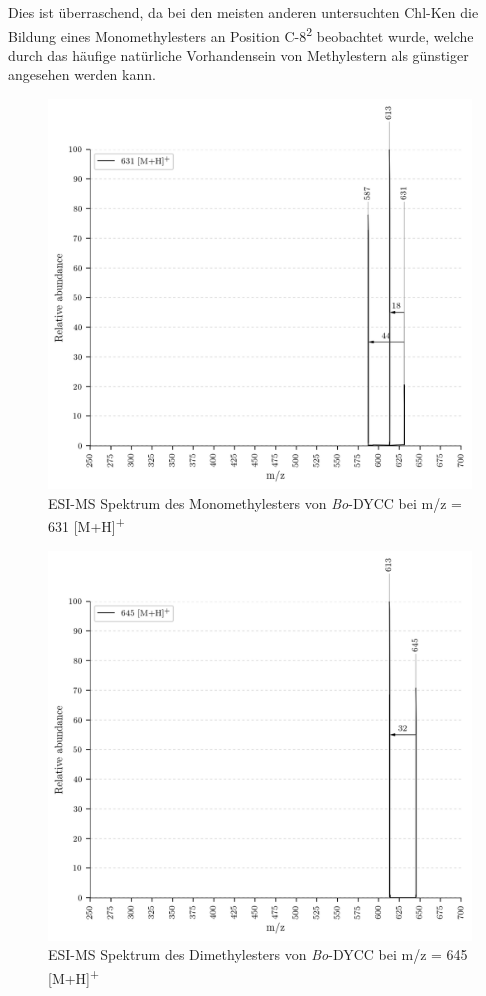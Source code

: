 Dies ist überraschend, da bei den meisten anderen untersuchten \gls{Chl-K}en die Bildung eines Monomethylesters an Position C-8\textsuperscript{2} beobachtet wurde, welche durch das häufige natürliche Vorhandensein von Methylestern als günstiger angesehen werden kann.

\begin{figure}[!htbp]
  \centering
  \includegraphics[width=\textwidth, height=0.7\textwidth]{figures/Kapitel7/Kataboliten/VWA_MS_631.png}
  \caption[ESI-MS Spektrum des Monomethylesters von \textit{Bo}-DYCC, Quelle: Author]{ESI-MS Spektrum des Monomethylesters von \textit{Bo}-DYCC bei m/z = 631 [M+H]\textsuperscript{+}}
  \label{fig:631MH}
\end{figure}

\begin{figure}[!htbp]
  \centering
  \includegraphics[width=\textwidth, height=0.6\textwidth]{figures/Kapitel7/Kataboliten/VWA_MS_645-2.png}
  \caption[ESI-MS Spektrum des Diethylesters von \textit{Bo}-DYCC, Quelle: Author]{ESI-MS Spektrum des Dimethylesters von \textit{Bo}-DYCC bei m/z = 645 [M+H]\textsuperscript{+}}
  \label{fig:RP645MH}
\end{figure}


